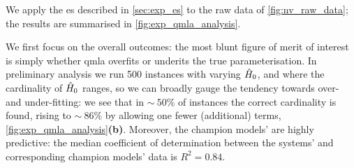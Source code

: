 We apply the \gls{es} described in \cref{sec:exp_es} to the raw data of \cref{fig:nv_raw_data};
    the results are summarised in \cref{fig:exp_qmla_analysis}.
\par 

We first focus on the overall outcomes:
    the most blunt figure of merit of interest is simply whether \gls{qmla}
    overfits or underits the true parameterisation. 
In preliminary analysis we run 500 \glspl{instance} with varying $\hat{H}_0$, 
    and where the cardinality of $\hat{H}_0$ ranges,
    so we can broadly gauge the tendency towards over- and under-fitting:
    we see that in $\sim~50\%$ of \glspl{instance} the correct cardinality is found,  
    rising to $\sim~86\%$ by allowing one fewer (additional) terms, \cref{fig:exp_qmla_analysis}\textbf{(b)}. 
Moreover, the \glspl{champion model}' are highly predictive: 
    the median coefficient of determination between the systems' and corresponding \glspl{champion model}' data is 
    $R^2 = 0.84$. 
\par 

